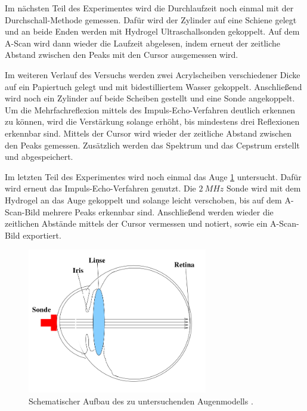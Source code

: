 Im nächsten Teil des Experimentes wird die Durchlaufzeit noch einmal mit der
Durchschall-Methode gemessen. Dafür wird der Zylinder auf eine Schiene gelegt und
an beide Enden werden mit Hydrogel Ultraschallsonden gekoppelt. Auf dem
A-Scan wird dann wieder die Laufzeit abgelesen, indem erneut der zeitliche
Abstand zwischen den Peaks mit den Cursor ausgemessen wird.

Im weiteren Verlauf des Versuchs werden zwei Acrylscheiben verschiedener Dicke
auf ein Papiertuch gelegt und mit bidestilliertem Wasser gekoppelt. Anschließend
wird noch ein Zylinder auf beide Scheiben gestellt und eine Sonde angekoppelt.
Um die Mehrfachreflexion mittels des Impuls-Echo-Verfahren deutlich erkennen zu
können, wird die Verstärkung
solange erhöht, bis mindestens drei Reflexionen erkennbar sind. Mittels der Cursor
wird wieder der zeitliche Abstand zwischen den Peaks gemessen. Zusätzlich werden
das Spektrum und das Cepstrum erstellt und abgespeichert.

Im letzten Teil des Experimentes wird noch einmal das Auge \ref{fig:Auge} untersucht. Dafür wird
erneut das Impuls-Echo-Verfahren genutzt. Die $\SI{2}{MHz}$ Sonde wird mit dem
Hydrogel an das Auge gekoppelt und solange leicht verschoben, bis auf dem A-Scan-Bild
mehrere Peaks erkennbar sind. Anschließend werden wieder die zeitlichen Abstände
mittels der Cursor vermessen und notiert, sowie ein A-Scan-Bild exportiert.

\begin{figure}
  \centering
  \includegraphics[width=0.7\textwidth]{Pics/Auge.png}
  \caption{Schematischer Aufbau des zu untersuchenden Augenmodells \cite{anleitung01}.}
  \label{fig:Auge}
\end{figure}
